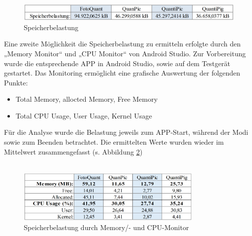 \begin{figure}[h]
	\centering
		\includegraphics[width=1.0\textwidth]{img/speicherbelastung_klein.png}
	\caption[Speicherbelastung durch System Monitor]{Speicherbelastung}
	\label{fig:speicherbel_apps}
\end{figure}

Eine zweite Möglichkeit die Speicherbelastung zu ermitteln erfolgte durch den „Memory Monitor“ und „CPU Monitor“ von Android Studio. Zur Vorbereitung wurde die entsprechende APP in Android Studio, sowie auf dem Testgerät gestartet. Das Monitoring ermöglicht eine grafische Auswertung der folgenden Punkte:

\begin{itemize}
\item Total Memory, allocted Memory, Free Memory
\item Total CPU Usage, User Usage, Kernel Usage
\end{itemize}

Für die Analyse wurde die Belastung jeweils zum APP-Start, während der Modi sowie zum Beenden betrachtet. Die ermittelten Werte wurden wieder im Mittelwert zusammengefasst (s. Abbildung \ref{fig:speicherbel2_apps})\\\

\begin{figure}[h]
	\centering
		\includegraphics[width=0.8\textwidth]{img/speicherbelastung_gross.png}
	\caption[Speicherbelastung durch Memory/- und CPU-Monitor]{Speicherbelastung durch Memory/- und CPU-Monitor}
	\label{fig:speicherbel2_apps}
\end{figure} 

